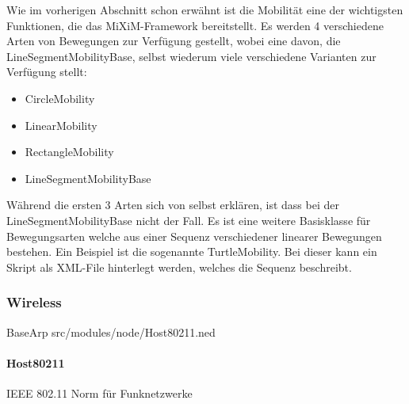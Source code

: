 Wie im vorherigen Abschnitt schon erwähnt ist die Mobilität eine der wichtigsten Funktionen, die das MiXiM-Framework bereitstellt. Es werden 4 verschiedene Arten von Bewegungen zur Verfügung gestellt, wobei eine davon, die LineSegmentMobilityBase, selbst wiederum viele verschiedene Varianten zur Verfügung stellt: 
\begin{itemize}
\item CircleMobility
\item LinearMobility
\item RectangleMobility
\item LineSegmentMobilityBase
\end{itemize}
Während die ersten 3 Arten sich von selbst erklären, ist dass bei der LineSegmentMobilityBase nicht der Fall. Es ist eine weitere Basisklasse für Bewegungsarten welche aus einer Sequenz verschiedener linearer Bewegungen bestehen. Ein Beispiel ist die sogenannte TurtleMobility. Bei dieser kann ein Skript als XML-File hinterlegt werden, welches die Sequenz beschreibt.

\subsubsection{Wireless}

BaseArp
src/modules/node/Host80211.ned

\paragraph{Host80211}

IEEE 802.11
Norm für Funknetzwerke










